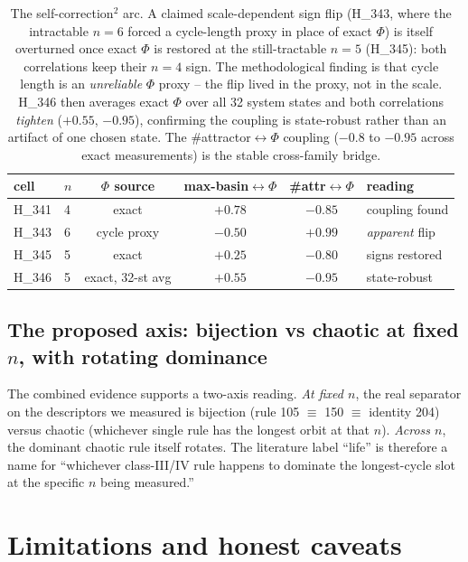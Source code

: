 \documentclass[11pt,a4paper]{article}
\begin{document}
\begin{table}[h]
\centering
\small
\begin{tabular}{llcccl}
\toprule
\textbf{cell} & \textbf{$n$} & \textbf{$\Phi$ source} &
\textbf{max-basin$\leftrightarrow\Phi$} &
\textbf{\#attr$\leftrightarrow\Phi$} & \textbf{reading} \\
\midrule
H\_341 & 4 & exact         & $+0.78$ & $-0.85$ & coupling found \\
H\_343 & 6 & cycle proxy   & $-0.50$ & $+0.99$ & \emph{apparent} flip \\
H\_345 & 5 & exact         & $+0.25$ & $-0.80$ & signs restored \\
H\_346 & 5 & exact, 32-st avg & $+0.55$ & $-0.95$ & state-robust \\
\bottomrule
\end{tabular}
\caption{The self-correction\texorpdfstring{$^2$}{2} arc. A claimed
scale-dependent sign flip (H\_343, where the intractable $n=6$ forced a
cycle-length proxy in place of exact $\Phi$) is itself overturned once
exact $\Phi$ is restored at the still-tractable $n=5$ (H\_345): both
correlations keep their $n=4$ sign. The methodological finding is that
cycle length is an \emph{unreliable} $\Phi$ proxy -- the flip lived in
the proxy, not in the scale. H\_346 then averages exact $\Phi$ over all
32 system states and both correlations \emph{tighten} ($+0.55$, $-0.95$),
confirming the coupling is state-robust rather than an artifact of one
chosen state. The \#attractor$\leftrightarrow\Phi$ coupling
($-0.8$ to $-0.95$ across exact measurements) is the stable cross-family
bridge.}
\label{tab:sc2}
\end{table}

\subsection{The proposed axis: bijection vs chaotic at fixed $n$, with rotating dominance}
The combined evidence supports a two-axis reading.
\emph{At fixed $n$}, the real separator on the descriptors we measured
is bijection (rule 105 $\equiv$ 150 $\equiv$ identity 204) versus
chaotic (whichever single rule has the longest orbit at that $n$).
\emph{Across $n$}, the dominant chaotic rule itself rotates.
The literature label
``life'' is therefore a name for ``whichever class-III/IV rule happens
to dominate the longest-cycle slot at the specific $n$ being measured.''

\section{Limitations and honest caveats}
\label{sec:limits}
\end{document}
